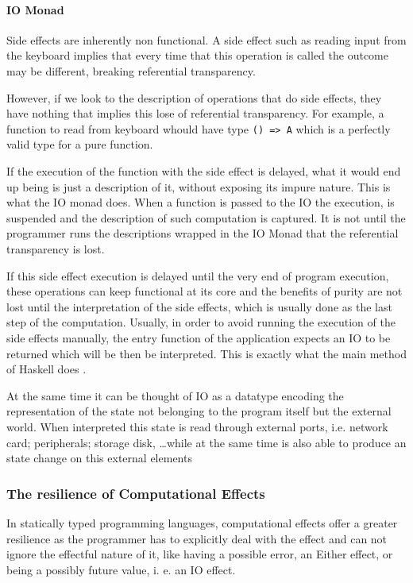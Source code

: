 \documentclass[../main.tex]{subfiles}
\begin{document}


\paragraph{IO Monad}
Side effects are inherently non functional. A side effect such as reading input
from the keyboard implies that every time that this operation is called the
outcome may be different, breaking referential transparency.

However, if we look to the description of operations that do side effects, they
have nothing that implies this lose of referential transparency. For example,
a function to read from keyboard whould have type \texttt{() => A} which is a
perfectly valid type for a pure function.

If the execution of the function with the side effect is delayed, what it
would end up being is just a description of it, without exposing its impure
nature. This is what the IO monad does. When a function is passed to the IO
the execution, is suspended and the description of such computation is captured. It is not
until the programmer runs the descriptions wrapped in the IO Monad that the
referential transparency is lost.

If this side effect execution is delayed until the very end of program execution, these operations
can keep functional at its core and the benefits of purity are not lost until
the interpretation of the side effects, which is usually done as the last step of
the computation. Usually, in order to avoid running the execution of the side
effects manually, the entry function of the application expects an IO to be
returned which will be then be interpreted. This is exactly what the main method
of Haskell does \autocite{AIO}.

At the same time it can be thought of IO as a datatype encoding the representation
of the state not belonging to the program itself but the external world. When
interpreted this state is read through external ports, i.e.
network card; peripherals; storage disk, \ldots while at the same time is also  able
to produce an state change on this external elements

\subsubsection{The resilience of Computational Effects}
In statically typed programming languages, computational effects offer a greater resilience as the
programmer has to explicitly deal with the effect and can not ignore the
effectful nature of it, like having a possible error, an Either effect, or being a possibly
future value, i. e. an IO effect.
\end{document}
